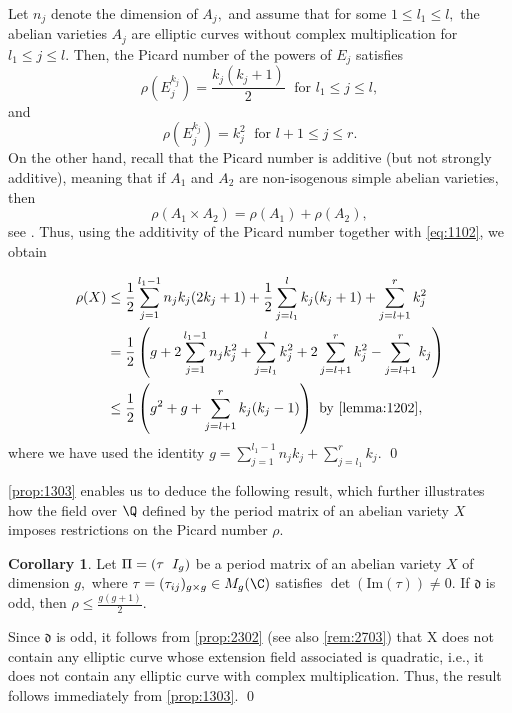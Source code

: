 \documentclass[11pt,leqno]{article}
\theoremstyle{definition}
\newtheorem{cor}{Corollary}[section]
\renewenvironment{proof}{{\bfseries \noindent Proof} }{ \qed \\}
\begin{document}
\begin{proof}
 Let $n_j$ denote the dimension of $A_j,$ and assume that for some $1\leq l_1\leq l,$ the abelian varieties $A_j$ are elliptic curves without complex multiplication for $l_1\leq j\leq l.$ Then, the Picard number of the powers of $E_j$ satisfies
 $$
 \rho(E_j^{k_j})=\frac{k_j(k_j+1)}{2}\; \text{ for } l_1\leq j \leq  l,$$
 and
 $$
 \rho(E_j^{k_j})=k_j^2 \; \text{ for } l+1\leq j \leq  r.
 $$
On the other hand, recall that the Picard number is additive (but not strongly additive), meaning that if $A_1$ and $A_2$ are non-isogenous simple abelian varieties, then
    $$
    \rho(A_1\times A_2)=\rho(A_1)+\rho(A_2),
    $$
    see \cite[Corollary 2.3]{hulek2019picard}. Thus, using the additivity of the Picard number together with \cref{eq:1102}, we obtain

\begin{equation*}
 \begin{split}
     \rho(X)&\leq\frac{1}{2}\sum_{j=1}^{l_1-1}n_jk_j(2k_j+1)+\frac{1}{2}\sum_{j=l_1}^{l}k_j(k_j+1)+\sum_{j=l+1}^{r}k_j^2\\
     &=\frac{1}{2}\left(g+2\sum_{j=1}^{l_1-1}n_jk_j^2+\sum_{j=l_1}^{l}k_j^2+2\sum_{j=l+1}^{r}k_j^2-\sum_{j=l+1}^{r}k_j  \right)\\
     &\leq \frac{1}{2}\left (g^2+g+ \sum_{j=l+1}^{r}k_j(k_j-1) \right) \text{ by \cref{lemma:1202}},
 \end{split}
 \end{equation*}
 where we have used the identity $g=\sum_{j=1}^{l_1-1}n_jk_j+\sum_{j=l_1}^{r}k_j.$
\end{proof}

\cref{prop:1303} enables us to deduce the following result, which further illustrates how the field over $\Q$ defined by the period matrix of an abelian variety $X$ imposes restrictions on the Picard number $\rho$.

\begin{cor}
    \label{cor:1303}
    Let $\Pi=(\tau\hspace{0.2cm}I_g)$ be a period matrix of an abelian variety $X$ of dimension $g,$ where $\tau=(\tau_{ij})_{g\times g}\in M_g(\C)$ satisfies $\det(\mathrm{Im}(\tau))\neq0.$ If $\mathfrak{d}$ is odd, then $\rho\leq\frac{g(g+1)}{2}.$  
\end{cor}

\begin{proof}
    Since $\mathfrak{d}$ is odd, it follows from \cref{prop:2302} (see also \cref{rem:2703}) that X does not contain any elliptic curve whose extension field associated is quadratic, i.e., it does not contain any elliptic curve with complex multiplication. Thus, the result follows immediately from \cref{prop:1303}.
 \end{proof}
\end{document}
